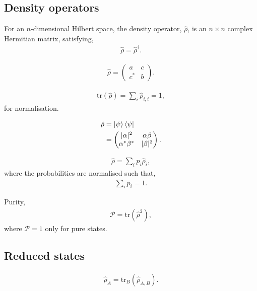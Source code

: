 \documentclass[aps,pra,twocolumn,amsmath,amssymb,nofootinbib,superscriptaddress]{revtex4}
\begin{document}
%
%

\subsection{Density operators}

For an $n$-dimensional Hilbert space, the density operator, $\hat\rho$, is an \mbox{$n\times n$} complex Hermitian matrix, satisfying,
\begin{align}
	\hat\rho = \hat\rho^\dag.
\end{align}

\begin{align}
\hat\rho = \left(\begin{matrix}{}
  a & c \nonumber\\
  c^* & b
\end{matrix}\right).
\end{align}

\begin{align}
\mathrm{tr}(\hat\rho)=\sum_i \hat\rho_{i,i} = 1,	
\end{align}
for normalisation.

\begin{align}
\hat\rho &= \ket\psi\bra\psi\nonumber\\
&= \left(\begin{matrix}{}
  |\alpha|^2 & \alpha\beta \nonumber\\
  \alpha^*\beta^* & |\beta|^2
\end{matrix}\right).
\end{align}

\begin{align}
	\hat\rho = \sum_i p_i \hat\rho_i,
\end{align}
where the probabilities are normalised such that,
\begin{align}
	\sum_i p_i = 1.
\end{align}

Purity,
\begin{align}
\mathcal{P} = \mathrm{tr}(\hat\rho^2),
\end{align}
where \mbox{$\mathcal{P}=1$} only for pure states.

%
%

\subsection{Reduced states}

\begin{align}
\hat\rho_A = \mathrm{tr}_B(\hat\rho_{A,B}).	
\end{align}
\end{document}
